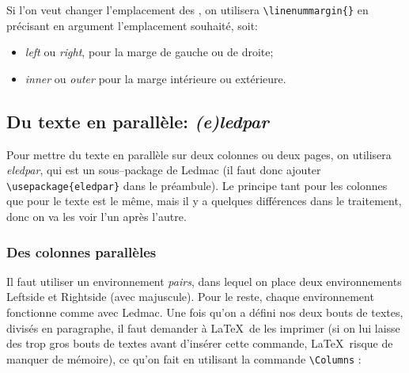 \documentclass[a4paper,twoside,french,12pt]{book}
\begin{document}
Si l'on veut changer l'emplacement des \nos, on utilisera \verb=\linenummargin{}= en précisant en argument l'emplacement souhaité, soit:
\begin{itemize}
\item \textit{left} ou \textit{right}, pour la marge de gauche ou de droite;
\item \textit{inner} ou \textit{outer} pour la marge intérieure ou extérieure.
\end{itemize}


\subsection{Du texte en parallèle: \textit{(e)ledpar}}

Pour mettre du texte en parallèle sur deux colonnes ou deux pages, on utilisera \textit{eledpar}, qui est un sous--package de Ledmac (il faut donc ajouter \verb=\usepackage{eledpar}= dans le préambule). Le principe tant pour les colonnes que pour le texte est le même, mais il y a quelques différences dans le traitement, donc on va les voir l'un après l'autre.

\subsubsection{Des colonnes parallèles}

Il faut utiliser un environnement \textit{pairs}, dans lequel on place deux environnements Leftside et Rightside (avec majuscule). Pour le reste, chaque environnement fonctionne comme avec Ledmac. Une fois qu'on a défini nos deux bouts de textes, divisés en paragraphe, il faut demander à \LaTeX\ de les imprimer (si on lui laisse des trop gros bouts de textes avant d'insérer cette commande, \LaTeX\ risque de manquer de mémoire), ce qu'on fait en utilisant la commande \verb=\Columns= :
\begin{verbatim}

\end{verbatim}
\end{document}
